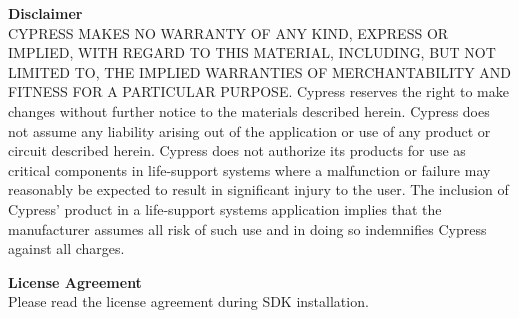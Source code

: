 \documentclass[twoside]{book}
\newcommand{\+}{\discretionary{\mbox{\scriptsize$\hookleftarrow$}}{}{}}
\newcommand{\clearemptydoublepage}{%
  \newpage{\pagestyle{empty}\cleardoublepage}%
}
\begin{document}
\vspace*{1cm}
\textbf{Disclaimer}\\
CYPRESS MAKES NO WARRANTY OF ANY KIND, EXPRESS OR IMPLIED, WITH REGARD TO THIS
MATERIAL, INCLUDING, BUT NOT LIMITED TO, THE IMPLIED WARRANTIES OF MERCHANTABILITY AND
FITNESS FOR A PARTICULAR PURPOSE. Cypress reserves the right to make changes without
further notice to the materials described herein. Cypress does not assume any liability
arising out of the application or use of any product or circuit described herein. Cypress
does not authorize its products for use as critical components in life-support systems
where a malfunction or failure may reasonably be expected to result in significant injury
to the user. The inclusion of Cypress' product in a life-support systems application
implies that the manufacturer assumes all risk of such use and in doing so indemnifies
Cypress against all charges.

\vspace*{1cm}
\textbf{License Agreement}\\
Please read the license agreement during SDK installation.

\clearemptydoublepage
\tableofcontents
\clearemptydoublepage
{}
\hypersetup{pageanchor=true}

\end{document}
